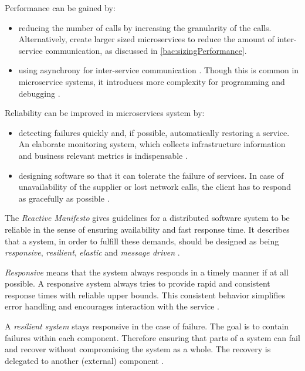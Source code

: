 Performance can be gained by:
\begin{itemize}
\item reducing the number of calls by increasing the granularity of the calls. Alternatively, create larger sized microservices to reduce the amount of inter-service communication, as discussed in \ref{bac:sizingPerformance}.
\item using asynchrony for inter-service communication \cite{FowlerDesignForFailure2014}.
Though this is common in microservice systems, it introduces more complexity for programming and debugging \cite{FowlerDesignForFailure2014}.
\end{itemize} 

Reliability can be improved in microservices system by:
\begin{itemize}
\item detecting failures quickly and, if possible, automatically restoring a service. An elaborate monitoring system, which collects infrastructure information and business relevant metrics is indispensable \cite{FowlerDesignForFailure2014}.
\item designing software so that it can tolerate the failure of services. In case of unavailability of the supplier or lost network calls, the client has to respond as gracefully as possible \cite{FowlerDesignForFailure2014}. 
\end{itemize}

The \textit{Reactive Manifesto} gives guidelines for a distributed software system to be reliable in the sense of ensuring availability and fast response time.
It describes that a system, in order to fulfill these demands, should be designed as being \textit{responsive}, \textit{resilient}, \textit{elastic} and \textit{message driven} \citep{Reactive2014}.

\textit{Responsive} means that the system always responds in a timely manner if at all possible. A responsive system always tries to provide rapid and consistent response times with reliable upper bounds. This consistent behavior simplifies error handling and encourages interaction with the service \citep{Reactive2014}.

A \textit{resilient system} stays responsive in the case of failure. 
The goal is to contain failures within each component. 
Therefore ensuring that parts of a system can fail and recover without compromising the system as a whole. 
The recovery is delegated to another (external) component \citep{Reactive2014}. 

